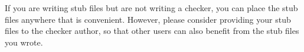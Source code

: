 %
%
%
%
%
%
%
%
%
%
%
%
%



If you are writing stub files but are not writing a checker, you can place
the stub files anywhere that is convenient.  However, please consider
providing your stub files to the checker author, so that other users can
also benefit from the stub files you wrote.

